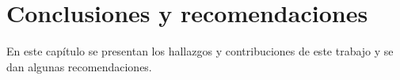 \chapter*{Conclusiones y recomendaciones} \label{chap:conclusiones}

En este capítulo se presentan los hallazgos y contribuciones de este trabajo y se dan algunas recomendaciones.\\
